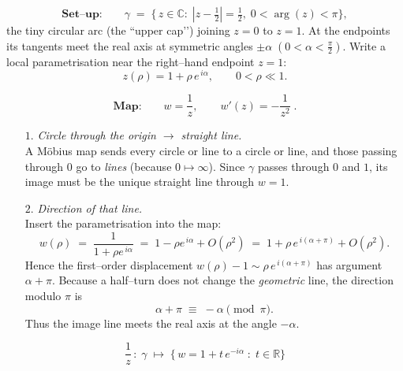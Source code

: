 \documentclass[12pt]{article}
\theoremstyle{definition} %
\theoremstyle{plain} %
\begin{document}
\[
  \textbf{Set–up:}\qquad
  \gamma\;=\;\bigl\{\,z\in\mathbb{C}:\;|z-\tfrac12|=\tfrac12,\;
                   0<\arg(z)<\pi\bigr\},
  \]
  the tiny circular arc (the “upper cap’’) joining \(z=0\) to \(z=1\).
  At the endpoints its tangents meet the real axis at symmetric
  angles \(\pm\alpha\;(0<\alpha<\tfrac{\pi}{2})\).
  Write a local parametrisation near the right–hand endpoint
  \(z=1\):
  \[
  z(\rho)=1+\rho\,e^{\,i\alpha},\qquad 0<\rho\ll1.
  \]
  
  \[
  \textbf{Map:}\qquad
  w=\frac{1}{z},\qquad w'(z)=-\frac{1}{z^{2}}\; .
  \]
  
  \begin{enumerate}
    \item[\(1.\)] \emph{Circle through the origin \(\longrightarrow\) straight line.}\\
          A Möbius map sends every circle or line to a circle or line, and
          those passing through \(0\) go to \emph{lines}
          (because \(0\mapsto\infty\)).
          Since \(\gamma\) passes through \(0\) and \(1\), its image must
          be the unique straight line through \(w=1\).
  
    \item[\(2.\)] \emph{Direction of that line.}\\
          Insert the parametrisation into the map:
          \[
          w(\rho)\;=\;\frac{1}{1+\rho e^{\,i\alpha}}
                     \;=\;
                     1-\rho e^{\,i\alpha}+O(\rho^{2})
                     \;=\;
                     1+\rho\,e^{\,i(\alpha+\pi)}+O(\rho^{2}).
          \]
          Hence the first–order displacement
          \(
            w(\rho)-1
            \sim
            \rho\,e^{\,i(\alpha+\pi)}
          \)
          has argument \(\alpha+\pi\).
          Because a half–turn does not change the \emph{geometric} line,
          the direction modulo \(\pi\) is
          \[
            \alpha+\pi\;\equiv\;-\alpha\pmod{\pi}.
          \]
          Thus the image line meets the real axis at the angle
          \(-\alpha\).
  
  \end{enumerate}
  
  \[
  \boxed{
     \frac{1}{z}\,:\;
     \gamma
     \;\longmapsto\;
     \bigl\{\,w=1+t\,e^{-i\alpha}\;:\;t\in\mathbb{R}\bigr\}
  }
  \]
  
\end{document}
